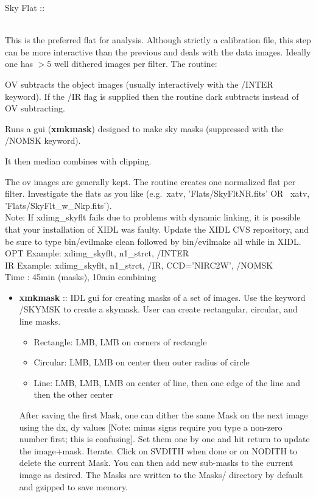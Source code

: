 \documentclass[11pt,letterpaper,dvips]{article}
\begin{document}
\begin{enumerate}
  {\Large  \item Sky Flat :: } \\
  This is the preferred flat for analysis.  Although strictly a
  calibration file, this step can be more interactive than the previous
  and deals with the data images.  Ideally one has $>5$ well dithered
  images per filter.  The routine:

  \begin{Aenumerate}
    \item OV subtracts the object images (usually interactively with the /INTER 
	keyword).  If the /IR flag is supplied then the routine dark subtracts instead of OV subtracting.
    \item Runs a gui ({\bf xmkmask}) designed to make sky masks (suppressed
	with the /NOMSK keyword). 
    \item It then median combines with clipping. 
  \end{Aenumerate}
    	The ov images are generally kept. The routine creates one normalized 
	flat per filter.  Investigate the flats as you like 
	(e.g.\ xatv, 'Flats/SkyFltNR.fits'  OR \ xatv, 'Flats/SkyFlt\_w\_Nkp.fits').  \\
	Note: If xdimg\_skyflt fails due to problems with dynamic linking, it is possible that your installation of XIDL was faulty.  Update the XIDL CVS repository, and be sure to type bin/evilmake clean followed by bin/evilmake all while in XIDL.\\
        \quad OPT Example: xdimg\_skyflt, n1\_strct, /INTER \\
        \quad IR Example: xdimg\_skyflt, n1\_strct, /IR, CCD='NIRC2W', /NOMSK \\
	\quad Time   : 45min (masks), 10min combining

	\begin{itemize}
	   \item {\bf xmkmask} :: IDL gui for creating masks of a set of
	images.  Use the keyword /SKYMSK to create a skymask.  User
	can create rectangular, circular, and line masks.
		\begin{itemize}
		  \item Rectangle: LMB, LMB on corners of rectangle
		  \item Circular: LMB, LMB on center then outer radius of circle
		  \item Line: LMB, LMB, LMB on center of line, then one edge
			of the line and then the other center
		\end{itemize}
	After saving the first Mask, one can dither the same Mask on the next
	image using the dx, dy values [Note: minus signs require you type a 
	non-zero number first; this is confusing].  
	Set them one by one and hit return
	to update the image+mask.  Iterate.  Click on SVDITH when done or on
	NODITH to delete the current Mask.  You can then add new sub-masks 
	to the
	current image as desired.  The Masks are written to the Masks/
	directory by default and gzipped to save memory.
	\end{itemize}
	


\end{enumerate}
\end{document}
